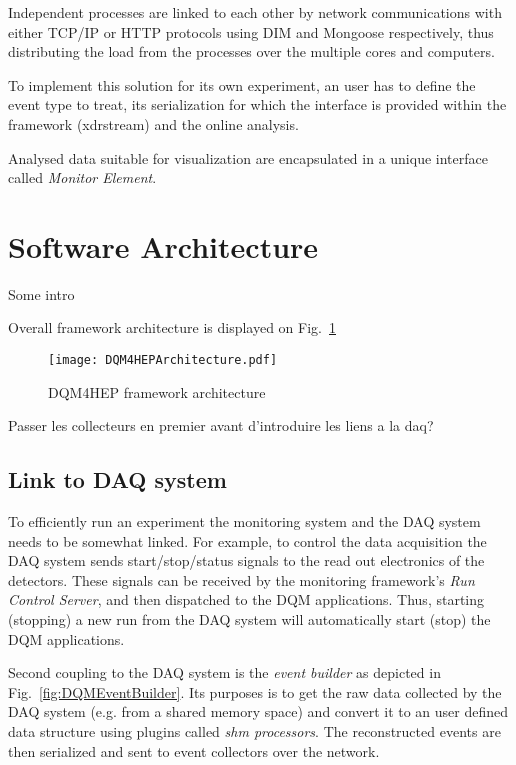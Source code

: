\documentclass[conference]{IEEEtran}
\begin{document}
Independent processes are linked to each other by network communications with either TCP/IP or HTTP protocols using DIM\cite{DIM} and Mongoose\cite{MONGOOSE} respectively, thus distributing the load from the processes over the multiple cores and computers.

To implement this solution for its own experiment, an user has to define the event type to treat, its serialization for which the interface is provided within the framework (xdrstream) and the online analysis.

Analysed data suitable for visualization are encapsulated in a unique interface called \emph{Monitor Element}.



\section{Software Architecture}
{\color{red}Some intro}

Overall framework architecture is displayed on Fig.~\ref{fig:DQM4HEPArchitecture}
\begin{figure}[htbp]
  \begin{center}
    \texttt{[image: DQM4HEPArchitecture.pdf]}
    \caption{\label{fig:DQM4HEPArchitecture} DQM4HEP framework architecture}
  \end{center}
\end{figure}

{\color{red}Passer les collecteurs en premier avant d'introduire les liens a la daq?}


\subsection{Link to DAQ system}
To efficiently run an experiment the monitoring system and the DAQ system needs to be somewhat linked. For example, to control the data acquisition the DAQ system sends start/stop/status signals to the read out electronics of the detectors. These signals can be received by the monitoring framework's \emph{Run Control Server}, and then dispatched to the DQM applications. Thus, starting (stopping) a new run from the DAQ system will automatically start (stop) the DQM applications.

Second coupling to the DAQ system is the \emph{event builder} as depicted in Fig.~\ref{fig:DQMEventBuilder}. Its purposes is to get the raw data collected by the DAQ system (e.g. from a shared memory space) and convert it to an user defined data structure using plugins called {\color{red}\textit{shm processors}}. The reconstructed events are then serialized and sent to event collectors over the network.
\end{document}
